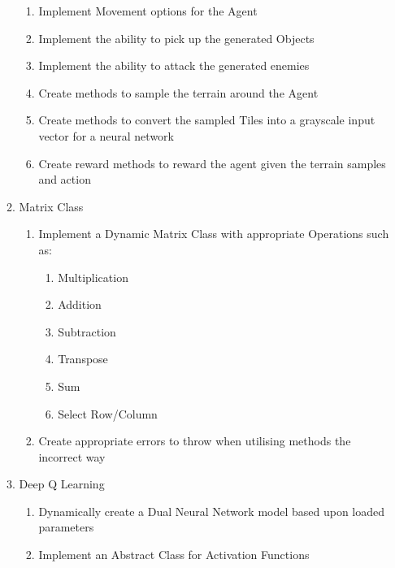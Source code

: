 \begin{flushleft}
\begin{enumerate}
\begin{enumerate}
                    \begin{enumerate}
                        \item Implement Movement options for the Agent
                        \item Implement the ability to pick up the generated Objects
                        \item Implement the ability to attack the generated enemies
                        \item Create methods to sample the terrain around the Agent
                        \item Create methods to convert the sampled Tiles into a grayscale input vector for a neural network
                        \item Create reward methods to reward the agent given the terrain samples and action
                    \end{enumerate}   
                \item Matrix Class
                    \begin{enumerate}
                        \item Implement a Dynamic Matrix Class with appropriate Operations such as:
                            \begin{enumerate}
                                \item Multiplication
                                \item Addition
                                \item Subtraction
                                \item Transpose
                                \item Sum
                                \item Select Row/Column
                            \end{enumerate}
                        \item Create appropriate errors to throw when utilising methods the incorrect way
                    \end{enumerate}   
                \item Deep Q Learning
                    \begin{enumerate}
                        \item Dynamically create a Dual Neural Network model based upon loaded parameters
                        \item Implement an Abstract Class for Activation Functions

\end{enumerate}
\end{enumerate}
\end{enumerate}
\end{flushleft}
